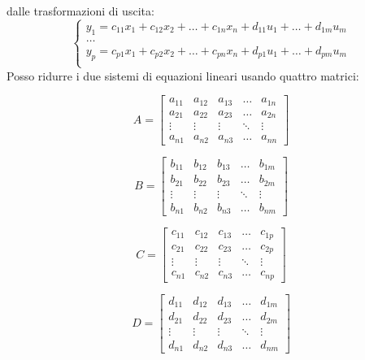 	dalle trasformazioni di uscita:
	\begin{equation*}
		\begin{cases}
			y_1 = c_{11}x_1+c_{12}x_2+\dots+c_{1n}x_n+d_{11}u_1 + \dots+d_{1m}u_m\\
			\dots\\
			y_p = c_{p1}x_1+c_{p2}x_2+\dots+c_{pn}x_n+d_{p1}u_1 + \dots+d_{pm}u_m\\
		\end{cases}
	\end{equation*}
	Posso ridurre i due sistemi di equazioni lineari usando quattro matrici:
	\begin{figure}[H]
		\centering
		\begin{minipage}{.5\textwidth}
			\centering
			\[
			A = \begin{bmatrix}
				a_{11} & a_{12} & a_{13} & \dots & a_{1n} \\
				a_{21} & a_{22} & a_{23} & \dots & a_{2n} \\
				\vdots & \vdots & \vdots & \ddots & \vdots \\
				a_{n1} & a_{n2} & a_{n3} & \dots & a_{nn}
			\end{bmatrix}
			\]
		\end{minipage}%
		\begin{minipage}{.5\textwidth}
			\centering
			\[
			B = \begin{bmatrix}
				b_{11} & b_{12} & b_{13} & \dots & b_{1m} \\
				b_{21} & b_{22} & b_{23} & \dots & b_{2m} \\
				\vdots & \vdots & \vdots & \ddots & \vdots \\
				b_{n1} & b_{n2} & b_{n3} & \dots & b_{nm}
			\end{bmatrix}
			\]
		\end{minipage}
		
		\vspace{.1cm}
		
		\begin{minipage}{.5\textwidth}
			\centering
			\[
			C = \begin{bmatrix}
				c_{11} & c_{12} & c_{13} & \dots & c_{1p} \\
				c_{21} & c_{22} & c_{23} & \dots & c_{2p} \\
				\vdots & \vdots & \vdots & \ddots & \vdots \\
				c_{n1} & c_{n2} & c_{n3} & \dots & c_{np}
			\end{bmatrix}
			\]
		\end{minipage}%
		\begin{minipage}{.5\textwidth}
			\centering
			\[
			D = \begin{bmatrix}
				d_{11} & d_{12} & d_{13} & \dots & d_{1m} \\
				d_{21} & d_{22} & d_{23} & \dots & d_{2m} \\
				\vdots & \vdots & \vdots & \ddots & \vdots \\
				d_{n1} & d_{n2} & d_{n3} & \dots & d_{nm}
			\end{bmatrix}
			\]
		\end{minipage}
	\end{figure}
